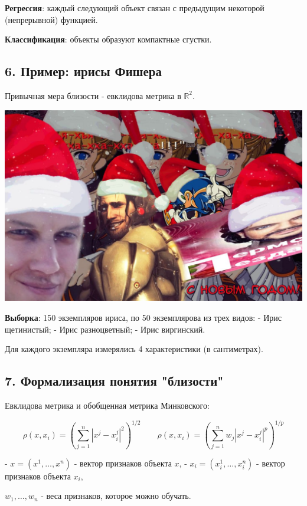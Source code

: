 \textbf{Регрессия}: каждый следующий объект связан с предыдущим некоторой
(непрерывной) функцией.

\textbf{Классификация}: объекты образуют компактные сгустки.

\subsection{6. Пример: ирисы Фишера}

Привычная мера близости - евклидова метрика в $\mathbb{R}^2$.

\includegraphics[scale=0.3]{figures/samplefigure.jpg}

\textbf{Выборка}: 150 экземпляров ириса, по 50 экземплярова из трех видов:
- Ирис щетинистый;
- Ирис разноцветный;
- Ирис виргинский.

Для каждого экземпляра измерялись 4 характеристики (в сантиметрах).

\subsection{7. Формализация понятия "близости"}

Евклидова метрика и обобщенная метрика Минковского:

$$\rho(x,x_i) = {\left( \sum_{j=1}^n{\left| x^j - x^j_i
\right|}^2\right)}^{1/2} \qquad \rho(x,x_i) = {\left(
\sum_{j=1}^n{w_j \left| x^j - x^j_i \right|}^p\right)}^{1/p}$$

- $x = (x^1, \ldots, x^n)$ - вектор признаков объекта $x$,
- $x_i = (x_i^1, \ldots, x_i^n)$ - вектор признаков объекта $x_i$,

$w_1, \ldots, w_n$ - веса признаков, которое можно обучать.

